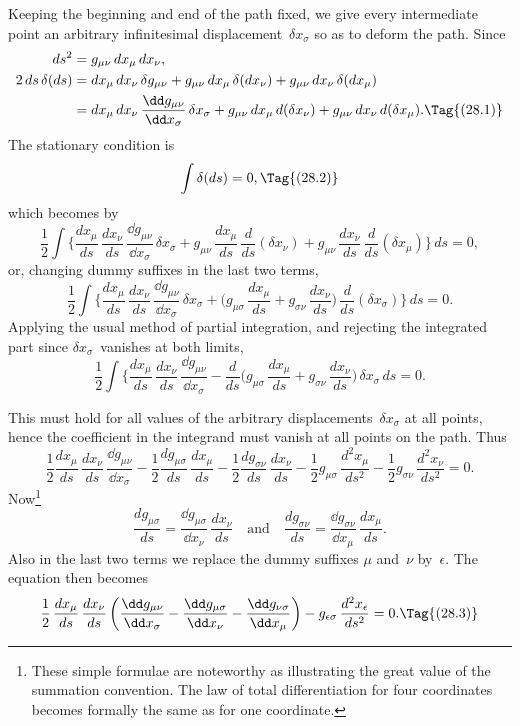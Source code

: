 \documentclass[12pt]{book}
\begin{document}
Keeping the beginning and end of the path fixed, we give every intermediate
point an arbitrary infinitesimal displacement~$\delta x_{\sigma}$ so as to deform the
path. Since
\begin{align*}
  ds^{2} &= g_{\mu\nu}\, dx_{\mu}\, dx_{\nu}, \\
  2\, ds\, \delta(ds)
  &= dx_{\mu}\, dx_{\nu} \, \delta g_{\mu\nu}
  + g_{\mu\nu}\, dx_{\mu}\, \delta(dx_{\nu})
  + g_{\mu\nu}\, dx_{\nu}\, \delta(dx_{\mu}) \\
  &= dx_{\mu}\, dx_{\nu}\, \frac{\dd g_{\mu\nu}}{\dd x_{\sigma}}\, \delta x_{\sigma}
  + g_{\mu\nu}\, dx_{\mu}\, d(\delta x_{\nu})
  + g_{\mu\nu}\, dx_{\nu}\, d(\delta x_{\mu}).
  \Tag{(28.1)}
\end{align*}
The stationary condition is
\[
\int \delta(ds) = 0,
\Tag{(28.2)}
\]
which becomes by~
\[
  \frac{1}{2} \int \biggl\{
  \frac{dx_{\mu}}{ds}\, \frac{dx_{\nu}}{ds}\, \frac{\dd g_{\mu\nu}}{\dd x_{\sigma}}\, \delta x_{\sigma}
  + g_{\mu\nu}\, \frac{dx_{\mu}}{ds}\, \frac{d}{ds}(\delta x_{\nu})
  + g_{\mu\nu}\, \frac{dx_{\nu}}{ds}\, \frac{d}{ds}(\delta x_{\mu})\biggr\}\, ds = 0,
\]
or, changing dummy suffixes in the last two terms,
\[
\frac{1}{2} \int \biggl\{
\frac{dx_{\mu}}{ds}\, \frac{dx_{\nu}}{ds}\, \frac{\dd g_{\mu\nu}}{\dd x_{\sigma}}\, \delta x_{\sigma}
+ \biggl(g_{\mu\sigma}\, \frac{dx_{\mu}}{ds} + g_{\sigma\nu}\, \frac{dx_{\nu}}{ds}\biggr)\, \frac{d}{ds}(\delta x_{\sigma})\biggr\}\, ds = 0.
\]
Applying the usual method of partial integration, and rejecting the integrated
part since $\delta x_{\sigma}$~vanishes at both limits,
\[
\frac{1}{2} \int \biggl\{
\frac{dx_{\mu}}{ds}\, \frac{dx_{\nu}}{ds}\, \frac{\dd g_{\mu\nu}}{\dd x_{\sigma}}
  - \frac{d}{ds} \biggl(g_{\mu\sigma}\, \frac{dx_{\mu}}{ds} + g_{\sigma\nu}\, \frac{dx_{\nu}}{ds}\biggr)\, \delta x_{\sigma}\, ds = 0.
\]

This must hold for all values of the arbitrary displacements~$\delta x_{\sigma}$ at all
%
points, hence the coefficient in the integrand must vanish at all points on the
path. Thus
\[
\frac{1}{2} \frac{dx_{\mu}}{ds}\, \frac{dx_{\nu}}{ds}\, \frac{\dd g_{\mu\nu}}{\dd x_{\sigma}}
  - \frac{1}{2} \frac{dg_{\mu\sigma}}{ds}\, \frac{dx_{\mu}}{ds}
  - \frac{1}{2} \frac{dg_{\sigma\nu}}{ds}\, \frac{dx_{\nu}}{ds}
  - \frac{1}{2} g_{\mu\sigma}\, \frac{d^{2}x_{\mu}}{ds^{2}}
  - \frac{1}{2} g_{\sigma\nu}\, \frac{d^{2}x_{\nu}}{ds^{2}} = 0.
\]
Now\footnote
  {These simple formulae are noteworthy as illustrating the great value of the summation
  convention. The law of total differentiation for four coordinates becomes formally the same as for
  one coordinate.}
\[
\frac{dg_{\mu\sigma}}{ds} = \frac{\dd g_{\mu\sigma}}{\dd x_{\nu}}\, \frac{dx_{\nu}}{ds}
\quad\text{and}\quad
\frac{dg_{\sigma\nu}}{ds} = \frac{\dd g_{\sigma\nu}}{\dd x_{\mu}}\, \frac{dx_{\mu}}{ds}.
\]
Also in the last two terms we replace the dummy suffixes $\mu$ and~$\nu$ by~$\epsilon$. The
equation then becomes
\[
\frac{1}{2}\, \frac{dx_{\mu}}{ds}\, \frac{dx_{\nu}}{ds}\,
\biggl(\frac{\dd g_{\mu\nu}}{\dd x_{\sigma}} - \frac{\dd g_{\mu\sigma}}{\dd x_{\nu}} - \frac{\dd g_{\nu\sigma}}{\dd x_{\mu}}\biggr)
- g_{\epsilon\sigma}\, \frac{d^{2} x_{\epsilon}}{ds^{2}} = 0.
\Tag{(28.3)}
\]
\end{document}
